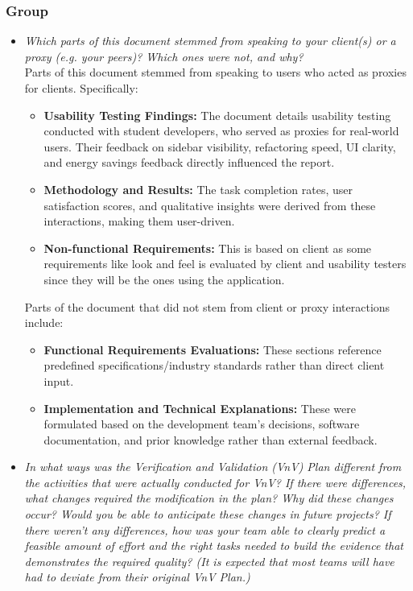 \documentclass[12pt, titlepage]{article}
\begin{document}
\subsubsection*{Group}
\begin{itemize}
  \item \textit{Which parts of this document stemmed from speaking to
      your client(s) or
    a proxy (e.g. your peers)? Which ones were not, and why?} \\

    Parts of this document stemmed from speaking to users who acted
    as proxies for clients. Specifically:
    \begin{itemize}
      \item \textbf{Usability Testing Findings:} The document details
        usability testing conducted with student developers, who
        served as proxies for real-world users. Their feedback on
        sidebar visibility, refactoring speed, UI clarity, and energy
        savings feedback directly influenced the report.
      \item \textbf{Methodology and Results:} The task completion
        rates, user satisfaction scores, and qualitative insights
        were derived from these interactions, making them user-driven.
      \item \textbf{Non-functional Requirements:} This is based on
        client as some requirements like look and feel is evaluated
        by client and usability testers since they will be the ones
        using the application.
    \end{itemize}

    Parts of the document that did not stem from client or proxy
    interactions include:
    \begin{itemize}

      \item \textbf{Functional Requirements Evaluations:} These
        sections reference predefined specifications/industry
        standards rather than direct client input.
      \item \textbf{Implementation and Technical Explanations:} These
        were formulated based on the development team's decisions,
        software documentation, and prior knowledge rather than
        external feedback.

    \end{itemize}


  \item \textit{In what ways was the Verification and Validation
      (VnV) Plan different
      from the activities that were actually conducted for VnV?  If there were
      differences, what changes required the modification in the plan?  Why did
      these changes occur?  Would you be able to anticipate these
      changes in future
      projects?  If there weren't any differences, how was your team
      able to clearly
      predict a feasible amount of effort and the right tasks needed
      to build the
      evidence that demonstrates the required quality?  (It is
        expected that most
    teams will have had to deviate from their original VnV Plan.)}\\


\end{itemize}
\end{document}
